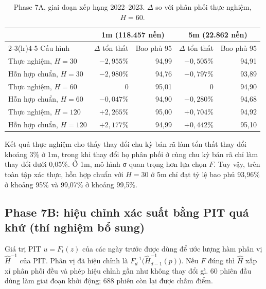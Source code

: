 \documentclass[11pt,a4paper]{article}
\begin{document}
\begin{table}[h]
\centering
\small
\caption{Phase 7A, giai đoạn xếp hạng 2022--2023. $\Delta$ so với phân phối thực nghiệm, $H=60$.}
\begin{tabular}{lrrrr}
\toprule
& \multicolumn{2}{c}{1m (118.457 nến)} & \multicolumn{2}{c}{5m (22.862 nến)} \\
\cmidrule(lr){2-3}\cmidrule(lr){4-5}
Cấu hình & $\Delta$ tổn thất & Bao phủ 95 & $\Delta$ tổn thất & Bao phủ 95 \\
\midrule
Thực nghiệm, $H=30$ & $-2{,}955\%$ & 94,99 & $-0{,}505\%$ & 94,91 \\
Hỗn hợp chuẩn, $H=30$ & $-2{,}980\%$ & 94,76 & $-0{,}797\%$ & 93,89 \\
Thực nghiệm, $H=60$ & 0 & 95,01 & 0 & 94,90 \\
Hỗn hợp chuẩn, $H=60$ & $-0{,}047\%$ & 94,90 & $-0{,}280\%$ & 94,68 \\
Thực nghiệm, $H=120$ & $+2{,}265\%$ & 95,00 & $+0{,}704\%$ & 94,92 \\
Hỗn hợp chuẩn, $H=120$ & $+2{,}177\%$ & 94,99 & $+0{,}442\%$ & 95,10 \\
\bottomrule
\end{tabular}
\end{table}

Kết quả thực nghiệm cho thấy thay đổi chu kỳ bán rã làm tổn thất thay đổi khoảng 3\% ở 1m, trong khi thay đổi họ phân phối ở cùng chu kỳ bán rã chỉ làm thay đổi dưới 0,05\%. Ở 1m, mô hình σ quan trọng hơn lựa chọn $F$. Tuy vậy, trên toàn tập xác thực, hỗn hợp chuẩn với $H=30$ ở 5m chỉ đạt tỷ lệ bao phủ 93,96\% ở khoảng 95\% và 99,07\% ở khoảng 99,5\%.

\subsection{Phase 7B: hiệu chỉnh xác suất bằng PIT quá khứ (thí nghiệm bổ sung)}

Giá trị PIT $u=F_t(z)$ của các ngày trước được dùng để ước lượng hàm phân vị $\hat H^{-1}$ của PIT. Phân vị đã hiệu chỉnh là $F_d^{-1}\bigl(\hat H_{d-1}^{-1}(p)\bigr)$. Nếu $F$ đúng thì $\hat H$ xấp xỉ phân phối đều và phép hiệu chỉnh gần như không thay đổi gì. 60 phiên đầu dùng làm giai đoạn khởi động; 688 phiên còn lại được chấm điểm.
\end{document}
